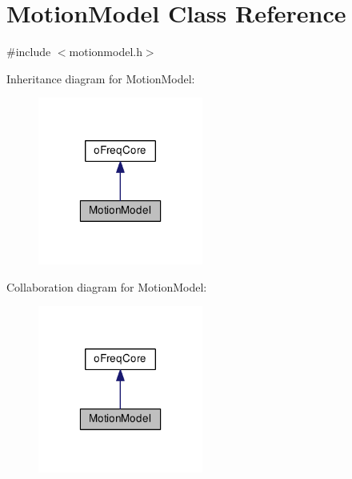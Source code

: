 \hypertarget{class_motion_model}{\section{Motion\-Model Class Reference}
\label{class_motion_model}
}


{\ttfamily \#include $<$motionmodel.\-h$>$}



Inheritance diagram for Motion\-Model\-:\nopagebreak
\begin{figure}[H]
\begin{center}
\leavevmode
\includegraphics[width=154pt]{class_motion_model__inherit__graph}
\end{center}
\end{figure}


Collaboration diagram for Motion\-Model\-:\nopagebreak
\begin{figure}[H]
\begin{center}
\leavevmode
\includegraphics[width=154pt]{class_motion_model__coll__graph}
\end{center}
\end{figure}
